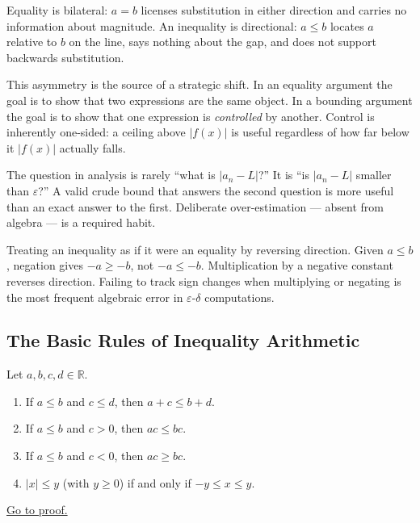 Equality is bilateral: $a=b$ licenses substitution in either direction and
carries no information about magnitude. An inequality is directional:
$a\leq b$ locates $a$ relative to $b$ on the line, says nothing about the
gap, and does not support backwards substitution.

This asymmetry is the source of a strategic shift. In an equality argument
the goal is to show that two expressions are the same object. In a bounding
argument the goal is to show that one expression is \emph{controlled} by
another. Control is inherently one-sided: a ceiling above $|f(x)|$ is useful
regardless of how far below it $|f(x)|$ actually falls.

\begin{remark}
The question in analysis is rarely ``what is $|a_n-L|$?'' It is ``is
$|a_n-L|$ smaller than $\varepsilon$?'' A valid crude bound that answers the
second question is more useful than an exact answer to the first. Deliberate
over-estimation --- absent from algebra --- is a required habit.
\end{remark}

\begin{remark}
Treating an inequality as if it were an equality by reversing direction.
Given $a\leq b$, negation gives $-a\geq -b$, not $-a\leq -b$. Multiplication
by a negative constant reverses direction. Failing to track sign changes
when multiplying or negating is the most frequent algebraic error in
$\varepsilon$-$\delta$ computations.
\end{remark}

\subsection*{The Basic Rules of Inequality Arithmetic}
\label{subsec:ineq-rules}

\begin{proposition}
\label{prop:order-arithmetic}
Let $a,b,c,d\in\mathbb{R}$.
\begin{enumerate}[label=(\roman*)]
  \item If $a\leq b$ and $c\leq d$, then $a+c\leq b+d$.
  \item If $a\leq b$ and $c>0$, then $ac\leq bc$.
  \item If $a\leq b$ and $c<0$, then $ac\geq bc$.
  \item $|x|\leq y$ (with $y\geq 0$) if and only if $-y\leq x\leq y$.
\end{enumerate}
\hyperref[prf:order-arithmetic]{Go to proof.}
\end{proposition}

